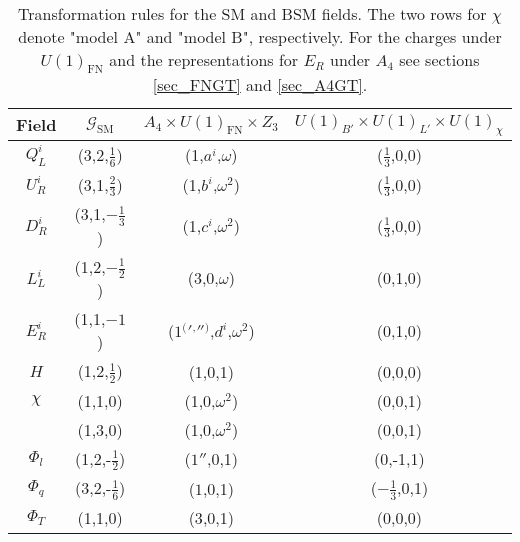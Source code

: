 \begin{table}[t]
 \begin{tabular}{c|c|c|c}
  Field & $\mathcal{G}_\text{SM}$ & $A_4 \times U(1)_\text{FN} \times Z_3$ & $U(1)_{B'}\times U(1)_{L'}\times U(1)_\chi$\\
  \hline
  $Q^i_L$ & (3,2,$\frac16$) & (1,$a^i$,$\omega$) & ($\frac13$,0,0)\\
  $U^i_R$ & (3,1,$\frac23$) & (1,$b^i$,$\omega^2$)& ($\frac13$,0,0)\\
  $D^i_R$ & (3,1,$-\frac13$) & (1,$c^i$,$\omega^2$)& ($\frac13$,0,0)\\
  $L^i_L$ & (1,2,$-\frac12$) & (3,0,$\omega$)& (0,1,0)\\
  $E^i_R$ & (1,1,$-1$) & ($1 {^(} {'} {^,} '' {^)} $,$d^i$,$\omega^2$)& (0,1,0)\\
  $H$ & (1,2,$\frac12$) & (1,0,1)& (0,0,0)\\
  \hline
  $\chi$ & (1,1,0) & (1,0,$\omega^2$)& (0,0,1)\\
 & (1,3,0) & (1,0,$\omega^2$)&(0,0,1)\\
  $\Phi_l$ & (1,2,-$\frac12$) & ($1''$,0,1)& (0,-1,1)\\
  $\Phi_q$ & (3,2,-$\frac16$) & ($1$,0,1)& ($-\frac13$,0,1)\\
  \hline
  $\Phi_T$ & (1,1,0) & ($3$,0,1)& (0,0,0)\\

 \end{tabular}
\caption{Transformation rules for the SM and BSM fields. The two rows for $\chi$ denote "model A" and "model B", respectively. For the charges under $U(1)_\text{FN}$ and the representations for $E_R$ under $A_4$ 
see sections \ref{sec_FNGT} and \ref{sec_A4GT}.}
\label{tab_models}
\end{table}
